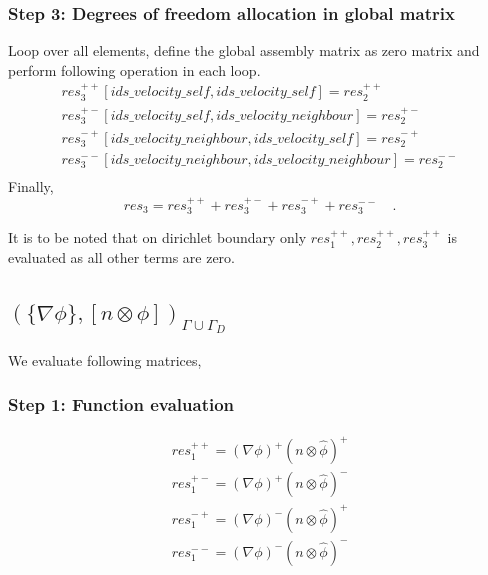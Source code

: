 \documentclass[a4paper,openany]{book}
\begin{document}
\subsubsection{Step 3: Degrees of freedom allocation in global matrix}

Loop over all elements, define the global assembly matrix as zero matrix and perform following operation in each loop.
\begin{equation}
\begin{split}
res_3^{++}[ids\_velocity\_self,ids\_velocity\_self] = res_2^{++}\\
res_3^{+-}[ids\_velocity\_self,ids\_velocity\_neighbour] = res_2^{+-}\\
res_3^{-+}[ids\_velocity\_neighbour,ids\_velocity\_self] = res_2^{-+}\\
res_3^{--}[ids\_velocity\_neighbour,ids\_velocity\_neighbour] = res_2^{--}\\
\end{split}
\end{equation}
Finally,
\begin{equation}
res_3 = res_3^{++} + res_3^{+-} + res_3^{-+} + res_3^{--} \quad \textrm{.}
\end{equation}

It is to be noted that on dirichlet boundary only $res_1^{++}, res_2^{++}, res_3^{++}$ is evaluated as all other terms are zero.

\subsection{$(\lbrace \nabla \phi \rbrace, [n \otimes \phi])_{\Gamma \cup \Gamma_D}$}

We evaluate following matrices,

\subsubsection{Step 1: Function evaluation}
\begin{equation}
\begin{split}
res_1^{++} = (\nabla \phi)^+ (n \otimes \hat{\phi})^+\\
res_1^{+-} = (\nabla \phi)^+ (n \otimes \hat{\phi})^-\\
res_1^{-+} = (\nabla \phi)^- (n \otimes \hat{\phi})^+\\
res_1^{--} = (\nabla \phi)^- (n \otimes \hat{\phi})^-\\
\end{split}
\end{equation}
\end{document}
